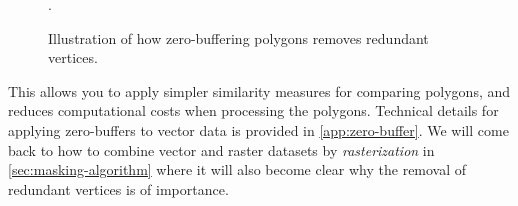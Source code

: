 \begin{figure}[H]
  \centering
  
  \caption{Illustration of how zero-buffering polygons removes redundant vertices.}%
  \label{fig:redundant-zero-buffer}.
\end{figure}

This allows you to apply simpler similarity measures for comparing polygons, and reduces computational costs when processing the polygons.
Technical details for applying zero-buffers to vector data is provided in \cref{app:zero-buffer}.
We will come back to how to combine vector and raster datasets by \textit{rasterization} in \cref{sec:masking-algorithm} where it will also become clear why the removal of redundant vertices is of importance.

